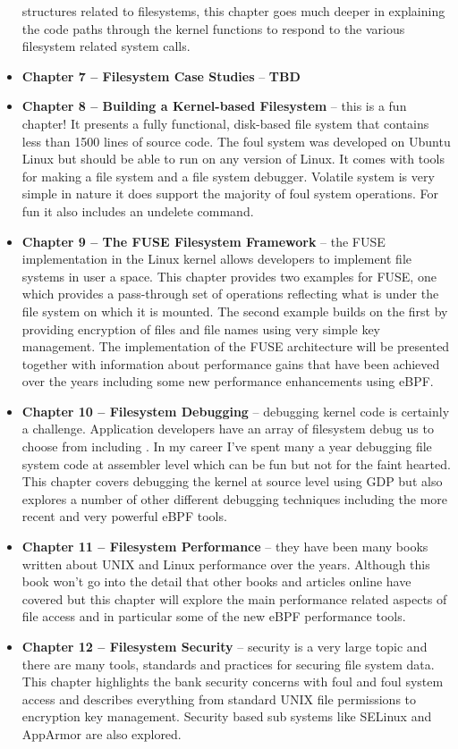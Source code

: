 \begin{itemize}
		structures related to filesystems, this chapter goes much deeper in explaining the code paths through the
		kernel functions to respond to the various filesystem related system calls.
	\item \textbf{Chapter 7 -- Filesystem Case Studies} -- \textbf{TBD}
	\item{\textbf{Chapter 8 -- Building a Kernel-based Filesystem}} -- this is a fun chapter! It presents a fully 
		functional, disk-based file system that contains less than 1500 lines of source code. The foul system was 
		developed on Ubuntu Linux but should be able to run on any version of Linux. It comes with tools 
		for making a file system and a file system debugger. Volatile system is very simple in nature it 
		does support the majority of foul system operations. For fun it also includes an undelete command.
	\item{\textbf{Chapter 9 -- The FUSE Filesystem Framework}} -- the FUSE implementation in the Linux kernel 
		allows developers to implement file systems in user a space. This chapter provides two examples for 
		FUSE, one which provides a pass-through set of operations reflecting what is under the file system on 
		which it is mounted. The second example builds on the first by providing encryption of files and file names 
		using very simple key management. The implementation of the FUSE architecture will be presented 
		together with information about performance gains that have been achieved over the years including 
		some new performance enhancements using eBPF.
	\item{\textbf{Chapter 10 -- Filesystem Debugging}} -- debugging kernel code is certainly a challenge. 
		Application developers have an array of filesystem debug us to choose from including . In my 
		career I've spent many a year debugging file system code at assembler level which can be fun but not for 
		the faint hearted. This chapter covers debugging the kernel at source level using GDP but also explores a 
		number of other different debugging techniques including the more recent and very powerful eBPF tools.
	\item{\textbf{Chapter 11 -- Filesystem Performance}} -- they have been many books written about UNIX and 
		Linux performance over the years. Although this book won't go into the detail that other books and 
		articles online have covered but this chapter will explore the main performance related aspects of 
		file access and in particular some of the new eBPF performance tools.
	\item{\textbf{Chapter 12 -- Filesystem Security}} -- security is a very large topic and there are many tools, 
		standards and practices for securing file system data. This chapter highlights the bank security concerns 
		with foul and foul system access and describes everything from standard UNIX file permissions to 
		encryption key management. Security based sub systems like SELinux and AppArmor are 
		also explored.
\end{itemize}

